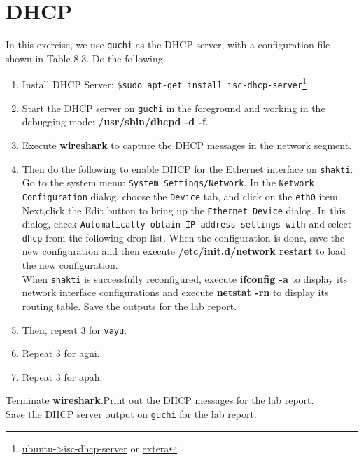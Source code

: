 \documentclass[10pt,a4paper]{article}
\numberwithin{equation}{section}
\numberwithin{figure}{section}
\numberwithin{table}{section}
\begin{document}
    \section*{DHCP}
    In this exercise, we use \texttt{guchi} as the DHCP server, with a configuration file shown in Table 8.3. Do the following.
    \begin{enumerate}
        \item Install DHCP Server: \texttt{\$sudo apt-get install isc-dhcp-server}\footnote{\href{https://help.ubuntu.com/community/isc-dhcp-server}{ubuntu->isc-dhcp-server} or \href{https://www.tecmint.com/install-dhcp-server-in-ubuntu-debian/}{extera}}
        \item Start the DHCP server on \texttt{guchi} in the foreground and working in the debugging mode: \textbf{/usr/sbin/dhcpd -d -f}.
        \item Execute \textbf{wireshark} to capture the DHCP messages in the network segment.
        \item Then do the following to enable DHCP for the Ethernet interface on \texttt{shakti}. \\
        Go to the system menu: \texttt{System Settings/Network}. In the \texttt{Network Configuration} dialog, choose the \texttt{Device} tab, and click on the \texttt{eth0} item. Next,click the Edit button to bring up the \texttt{Ethernet Device} dialog. In this dialog, check \texttt{Automatically obtain IP address settings with} and select \texttt{dhcp} from the following drop list. When the configuration is done, save the new configuration and then execute \textbf{/etc/init.d/network restart} to load the new configuration. \\
        When \texttt{shakti} is successfully reconfigured, execute \textbf{ifconfig -a} to display its network interface configurations and execute \textbf{netstat -rn} to display its routing table.
        Save the outputs for the lab report.
        \item Then, repeat 3 for \texttt{vayu}.
        \item Repeat 3 for agni.
        \item Repeat 3 for apah.
    \end{enumerate}
    Terminate \textbf{wireshark}.Print out the DHCP messages for the lab report. \\
    Save the DHCP server output on \texttt{guchi} for the lab report.
\end{document}

